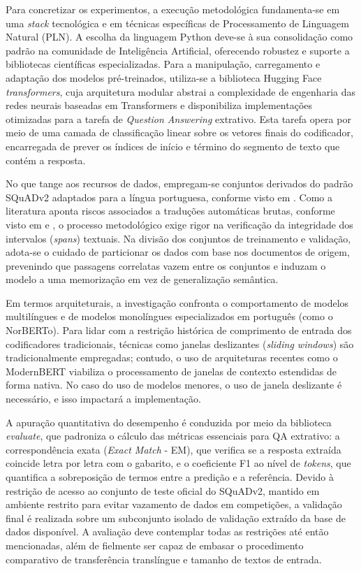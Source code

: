 \documentclass[12pt,a4paper]{article}
\begin{document}
Para concretizar os experimentos, a execução metodológica fundamenta-se em uma \textit{stack} tecnológica e em técnicas específicas de Processamento de Linguagem Natural (PLN). A escolha da linguagem Python deve-se à sua consolidação como padrão na comunidade de Inteligência Artificial, oferecendo robustez e suporte a bibliotecas científicas especializadas. Para a manipulação, carregamento e adaptação dos modelos pré-treinados, utiliza-se a biblioteca Hugging Face \textit{transformers}, cuja arquitetura modular abstrai a complexidade de engenharia das redes neurais baseadas em Transformers e disponibiliza implementações otimizadas para a tarefa de \textit{Question Answering} extrativo. Esta tarefa opera por meio de uma camada de classificação linear sobre os vetores finais do codificador, encarregada de prever os índices de início e término do segmento de texto que contém a resposta.

No que tange aos recursos de dados, empregam-se conjuntos derivados do padrão SQuADv2 adaptados para a língua portuguesa, conforme visto em \cite{savant}. Como a literatura aponta riscos associados a traduções automáticas brutas, conforme visto em \cite{ambala} e \cite{savant}, o processo metodológico exige rigor na verificação da integridade dos intervalos (\textit{spans}) textuais. Na divisão dos conjuntos de treinamento e validação, adota-se o cuidado de particionar os dados com base nos documentos de origem, prevenindo que passagens correlatas vazem entre os conjuntos e induzam o modelo a uma memorização em vez de generalização semântica. 

Em termos arquiteturais, a investigação confronta o comportamento de modelos multilíngues e de modelos monolíngues especializados em português (como o NorBERTo). Para lidar com a restrição histórica de comprimento de entrada dos codificadores tradicionais, técnicas como janelas deslizantes (\textit{sliding windows}) são tradicionalmente empregadas; contudo, o uso de arquiteturas recentes como o ModernBERT viabiliza o processamento de janelas de contexto estendidas de forma nativa. No caso do uso de modelos menores, o uso de janela deslizante é necessário, e isso impactará a implementação.

A apuração quantitativa do desempenho é conduzida por meio da biblioteca \textit{evaluate}, que padroniza o cálculo das métricas essenciais para QA extrativo: a correspondência exata (\textit{Exact Match} - EM), que verifica se a resposta extraída coincide letra por letra com o gabarito, e o coeficiente F1 ao nível de \textit{tokens}, que quantifica a sobreposição de termos entre a predição e a referência. Devido à restrição de acesso ao conjunto de teste oficial do SQuADv2, mantido em ambiente restrito para evitar vazamento de dados em competições, a validação final é realizada sobre um subconjunto isolado de validação extraído da base de dados disponível. A avaliação deve contemplar todas as restrições até então mencionadas, além de fielmente ser capaz de embasar o procedimento comparativo de transferência translíngue e tamanho de textos de entrada.
\end{document}
